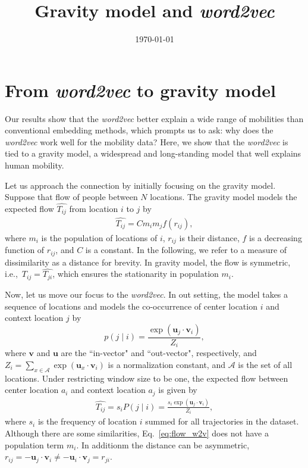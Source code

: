 \documentclass[12pt]{article} %
\def\given{\mid}
\def\ie{i.e.,~}
\begin{document}

\title{Gravity model and \textit{\textit{word2vec}}} %
\date{\today}
\maketitle %

\section{From \textit{word2vec} to gravity model}

Our results show that the \textit{word2vec} better explain a wide range of mobilities than conventional embedding methods, which prompts us to ask: why does the \textit{word2vec} work well for the mobility data?
Here, we show that the \textit{word2vec} is tied to a gravity model, a widespread and long-standing model that well explains human mobility.

Let us approach the connection by initially focusing on the gravity model.
Suppose that flow of people between $N$ locations. The gravity model models the expected flow $\hat{T_{ij}}$ from location $i$ to $j$ by
\begin{align}
    \hat{T_{ij}} = C m_i m_j f(r_{ij}), \label{eq:gravity_model}
\end{align}
where $m_i$ is the population of locations of $i$, $r_{ij}$ is their distance, $f$ is a decreasing function of $r_{ij}$, and $C$ is a constant.
In the following, we refer to a measure of dissimilarity as a distance for brevity.
In gravity model, the flow is symmetric, \ie $\hat{T_{ij}}=\hat{T_{ji}}$, which ensures the stationarity in population $m_{i}$.


Now, let us move our focus to the \textit{word2vec}.
In out setting, the model takes a sequence of locations and models the co-occurrence of center location $i$ and context location $j$ by
\begin{equation}
    p(j \given i) = \frac{\exp(\bm{u}_j \cdot \bm{v}_{i})}{Z_i},
\end{equation}
where $\bm{v}$ and $\bm{u}$ are the ``in-vector" and ``out-vector", respectively, and $Z_i=\sum_{x \in \mathcal{A}} \exp(\bm{u}_{x} \cdot \bm{v}_{i})$ is a normalization constant,
and $\mathcal{A}$ is the set of all locations.
Under restricting window size to be one, the expected flow between center location $a_i$ and context location $a_j$ is given by
\begin{align}
    \label{eq:flow_w2v}
    \hat{T_{ij}}=s_i P(j\given i) = \frac{s_i\exp(\bm{u}_j \cdot \bm{v}_{i})}{Z_i},
\end{align}
where $s_i$ is the frequency of location $i$ summed for all trajectories in the dataset.
Although there are some similarities, Eq.~\ref{eq:flow_w2v} does not have a population term $m_i$. In additionm the distance can be asymmetric, $r_{ij}=- \bm{u}_{j} \cdot \bm{v}_{i} \neq - \bm{u}_{i} \cdot \bm{v}_{j}=r_{ji}$.
\end{document}
